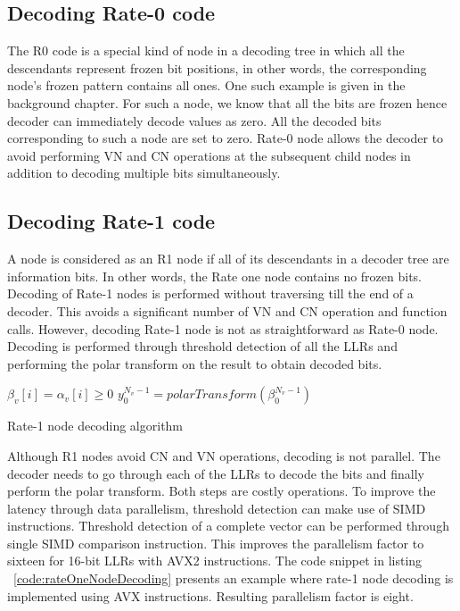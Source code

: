\subsection{Decoding Rate-0 code}
The R0 code is a special kind of node in a decoding tree in which all the descendants represent frozen bit positions, in other words, the corresponding node's frozen pattern contains all ones. One such example is given in the background chapter. For such a node, we know that all the bits are frozen hence decoder can immediately decode values as zero. All the decoded bits corresponding to such a node are set to zero. Rate-0 node allows the decoder to avoid performing VN and CN operations at the subsequent child nodes in addition to decoding multiple bits simultaneously.

\subsection{Decoding Rate-1 code}
A node is considered as an R1 node if all of its descendants in a decoder tree are information bits. In other words, the Rate one node contains no frozen bits. Decoding of Rate-1 nodes is performed without traversing till the end of a decoder. This avoids a significant number of VN and CN operation and function calls. However, decoding Rate-1 node is not as straightforward as Rate-0 node. Decoding is performed through threshold detection of all the LLRs and performing the polar transform on the result to obtain decoded bits.

\IncMargin{1.5em}
\begin{algorithm}[]
	 {
		 {
			$\beta_{v}[i] = \alpha_{v}[i] \ge 0$\;
		}
		$y_{0}^{N_v-1} = polarTransform(\beta_{0}^{N_v-1})$ \;
	}
	\caption{Rate-1 node decoding algorithm}
	\label{algo:R1Decoding}
\end{algorithm}
\DecMargin{1.5em}

Although R1 nodes avoid CN and VN operations, decoding is not parallel. The decoder needs to go through each of the LLRs to decode the bits and finally perform the polar transform. Both steps are costly operations. To improve the latency through data parallelism, threshold detection can make use of SIMD instructions. Threshold detection of a complete vector can be performed through single SIMD comparison instruction. This improves the parallelism factor to sixteen for 16-bit LLRs with {AVX2} instructions. The code snippet in listing ~\ref{code:rateOneNodeDecoding} presents an example where rate-1 node decoding is implemented using AVX instructions. Resulting parallelism factor is eight.

